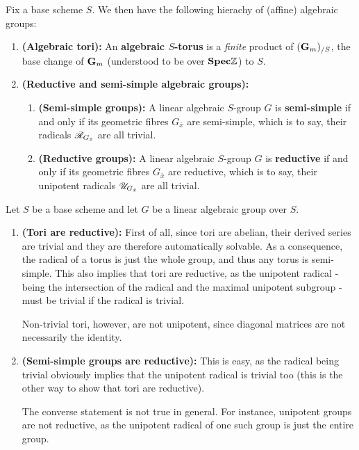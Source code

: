             \begin{definition} \label{def: tori_and_reductive_groups}
                Fix a base scheme $S$. We then have the following hierachy of (affine) algebraic groups:
                \begin{enumerate}
                    \item \textbf{(Algebraic tori):} An \textbf{algebraic $S$-torus} is a \textit{finite} product of $(\mathbf{G}_m)_{/S}$, the base change of $\mathbf{G}_m$ (understood to be over $\mathbf{Spec} \mathbb{Z}$) to $S$.
                    \item \textbf{(Reductive and semi-simple algebraic groups):} 
                        \begin{enumerate}
                            \item \textbf{(Semi-simple groups):} A linear algebraic $S$-group $G$ is \textbf{semi-simple} if and only if its geometric fibres $G_{\bar{x}}$ are semi-simple, which is to say, their radicals $\mathscr{R}_{G_{\bar{x}}}$ are all trivial. 
                            \item \textbf{(Reductive groups):} A linear algebraic $S$-group $G$ is \textbf{reductive} if and only if its geometric fibres $G_{\bar{x}}$ are reductive, which is to say, their unipotent radicals $\mathscr{U}_{G_{\bar{x}}}$ are all trivial.
                        \end{enumerate}
                \end{enumerate}
            \end{definition}
            \begin{remark} \label{remark: tori_and_reductive_groups}
                Let $S$ be a base scheme and let $G$ be a linear algebraic group over $S$.
                \begin{enumerate}
                    \item \textbf{(Tori are reductive):} First of all, since tori are abelian, their derived series are trivial and they are therefore automatically solvable. As a consequence, the radical of a torus is just the whole group, and thus any torus is semi-simple. This also implies that tori are reductive, as the unipotent radical - being the intersection of the radical and the maximal unipotent subgroup - must be trivial if the radical is trivial.
                    
                    Non-trivial tori, however, are not unipotent, since diagonal matrices are not necessarily the identity.
                    \item \textbf{(Semi-simple groups are reductive):} This is easy, as the radical being trivial obviously implies that the unipotent radical is trivial too (this is the other way to show that tori are reductive). 
                    
                    The converse statement is not true in general. For instance, unipotent groups are not reductive, as the unipotent radical of one such group is just the entire group.
                \end{enumerate}
            \end{remark}
                    
